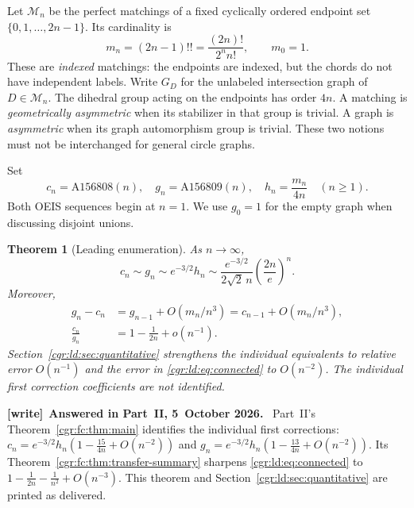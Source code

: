 \documentclass[11pt,letterpaper]{article}
\numberwithin{equation}{section}
\newtheorem{theorem}{Theorem}[section]
\theoremstyle{definition}\newtheorem{definition}[theorem]{Definition}
\theoremstyle{remark}\newtheorem{remark}[theorem]{Remark}
\newenvironment{writenote}[1][]{\par\smallskip\begingroup\small
 \noindent\textbf{[write]}\if\relax\detokenize{#1}\relax\else~\textbf{#1.}\fi\ }%
 {\par\endgroup\smallskip}
\begin{document}
Let $\mathcal M_n$ be the perfect matchings of a fixed cyclically
ordered endpoint set $\{0,1,\ldots,2n-1\}$. Its cardinality is
\begin{equation}\label{cgr:ld:eq:mn}
 m_n=(2n-1)!!=\frac{(2n)!}{2^n n!},\qquad m_0=1.
\end{equation}
These are \emph{indexed} matchings: the endpoints are indexed, but
the chords do not have independent labels. Write $G_D$ for the
unlabeled intersection graph of $D\in\mathcal M_n$. The dihedral
group acting on the endpoints has order $4n$. A matching is
\emph{geometrically asymmetric} when its stabilizer in that group is
trivial. A graph is \emph{asymmetric} when its graph automorphism
group is trivial. These two notions must not be interchanged for
general circle graphs.

Set
\begin{equation}\label{cgr:ld:eq:sequences}
 c_n=\mathrm{A156808}(n),\quad
 g_n=\mathrm{A156809}(n),\quad
 h_n=\frac{m_n}{4n}\quad(n\ge1).
\end{equation}
Both OEIS sequences begin at $n=1$. We use $g_0=1$ for the empty
graph when discussing disjoint unions.

\begin{theorem}[Leading enumeration]\label{cgr:ld:thm:main}
As $n\to\infty$,
\begin{equation}\label{cgr:ld:eq:main}
 c_n\sim g_n\sim e^{-3/2}h_n
 \sim\frac{e^{-3/2}}{2\sqrt2\,n}\left(\frac{2n}{e}\right)^n.
\end{equation}
Moreover,
\begin{align}
 g_n-c_n&=g_{n-1}+O(m_n/n^3)
          =c_{n-1}+O(m_n/n^3),\label{cgr:ld:eq:gap}\\
 \frac{c_n}{g_n}&=1-\frac1{2n}+o(n^{-1}).\label{cgr:ld:eq:connected}
\end{align}
Section~\ref{cgr:ld:sec:quantitative} strengthens the individual equivalents
to relative error $O(n^{-1})$ and the error in
\eqref{cgr:ld:eq:connected} to $O(n^{-2})$. The individual first
correction coefficients are not identified.
\end{theorem}
\begin{writenote}[Answered in Part~II, 5~October 2026]
Part~II's Theorem~\ref{cgr:fc:thm:main} identifies the individual first corrections: $c_n=e^{-3/2}h_n(1-\frac{15}{4n}+O(n^{-2}))$ and $g_n=e^{-3/2}h_n(1-\frac{13}{4n}+O(n^{-2}))$. Its Theorem~\ref{cgr:fc:thm:transfer-summary} sharpens \eqref{cgr:ld:eq:connected} to $1-\frac1{2n}-\frac1{n^2}+O(n^{-3})$. This theorem and Section~\ref{cgr:ld:sec:quantitative} are printed as delivered.
\end{writenote}
\end{document}

